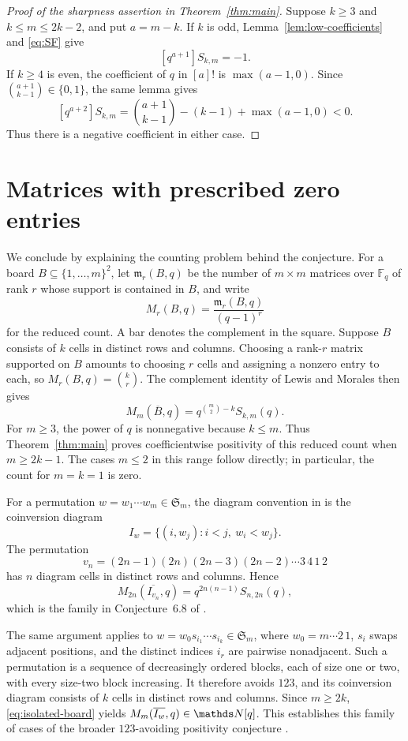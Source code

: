 \documentclass[11pt]{amsart}
\newcommand{\Fq}{\mathds F_q}
\newcommand{\cS}{\mathfrak S}
\begin{document}
\begin{proof}[Proof of the sharpness assertion in Theorem~\ref{thm:main}]
Suppose $k\ge3$ and $k\le m\le2k-2$, and put $a=m-k$.
If $k$ is odd, Lemma~\ref{lem:low-coefficients} and \eqref{eq:SF} give
\[
 [q^{a+1}]S_{k,m}=-1.
\]
If $k\ge4$ is even, the coefficient of $q$ in $[a]!$ is
$\max(a-1,0)$. Since $\binom{a+1}{k-1}\in\{0,1\}$, the same lemma
gives
\[
 [q^{a+2}]S_{k,m}
 =\binom{a+1}{k-1}-(k-1)+\max(a-1,0)<0.
\]
Thus there is a negative coefficient in either case.
\end{proof}

\section{Matrices with prescribed zero entries}\label{sec:matrices}

We conclude by explaining the counting problem behind the conjecture.
For a board $B\subseteq\{1,\ldots,m\}^2$, let $\mathfrak m_r(B,q)$
be the number of $m\times m$ matrices over $\Fq$ of rank $r$ whose
support is contained in $B$, and write
\[
 M_r(B,q)=\frac{\mathfrak m_r(B,q)}{(q-1)^r}
\]
for the reduced count. A bar denotes the complement in the square.
Suppose $B$ consists of $k$ cells in distinct rows and columns. Choosing
a rank-$r$ matrix supported on $B$ amounts to choosing $r$ cells and
assigning a nonzero entry to each, so $M_r(B,q)=\binom kr$.
The complement identity of Lewis and Morales
\cite[Corollary~2.2]{LM} then gives
\begin{equation}\label{eq:isolated-board}
 M_m(\overline B,q)=q^{\binom m2-k}S_{k,m}(q).
\end{equation}
For $m\ge3$, the power of $q$ is nonnegative because $k\le m$.
Thus Theorem~\ref{thm:main} proves coefficientwise positivity of this
reduced count when $m\ge2k-1$. The cases $m\le2$ in this range follow
directly; in particular, the count for $m=k=1$ is zero.

For a permutation $w=w_1\cdots w_m\in\cS_m$, the diagram convention
in \cite{LM} is the coinversion diagram
\[
 I_w=\{(i,w_j):i<j,\ w_i<w_j\}.
\]
The permutation
\[
 v_n=(2n-1)(2n)(2n-3)(2n-2)\cdots3\,4\,1\,2
\]
has $n$ diagram cells in distinct rows and columns. Hence
\begin{equation}\label{eq:LM-matrix}
 M_{2n}(\overline{I_{v_n}},q)=q^{2n(n-1)}S_{n,2n}(q),
\end{equation}
which is the family in Conjecture~6.8 of \cite{LM}.

The same argument applies to
$w=w_0s_{i_1}\cdots s_{i_k}\in\cS_m$, where $w_0=m\cdots2\,1$,
$s_i$ swaps adjacent positions, and the distinct indices $i_r$ are
pairwise nonadjacent. Such a permutation is a sequence of decreasingly
ordered blocks, each of size one or two, with every size-two block
increasing. It therefore avoids $123$, and its coinversion diagram
consists of $k$ cells in distinct rows and columns. Since $m\ge2k$,
\eqref{eq:isolated-board} yields
$M_m(\overline{I_w},q)\in\N[q]$. This establishes this family of cases
of the broader $123$-avoiding positivity conjecture
\cite[Conjecture~6.9]{LM}.
\end{document}
